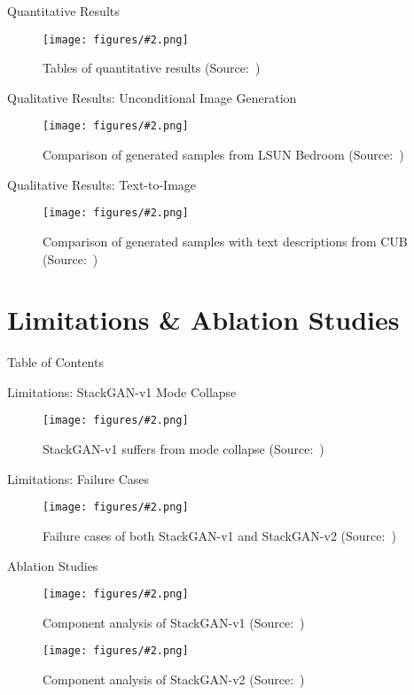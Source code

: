 \documentclass{beamer}
\newcommand{\paperfigure}[3][width=\textwidth]{%
    \begin{figure}%
        \centering%
        \texttt{[image: figures/\#2.png]}%
        \caption{#3 (Source:~\cite{stackgan++})}%
    \end{figure}%
}
\begin{document}

\begin{frame}{Quantitative Results}
    \paperfigure[width=\textwidth]{quantitative_results}{Tables of quantitative results}
\end{frame}

\begin{frame}{Qualitative Results: Unconditional Image Generation}
    \paperfigure[width=\textwidth]{qualitative_results_unconditional}{Comparison of generated samples from LSUN Bedroom}
\end{frame}

\begin{frame}{Qualitative Results: Text-to-Image}
    \paperfigure[width=0.9\textwidth]{qualitative_results_conditional}{Comparison of generated samples with text descriptions from CUB}
\end{frame}

\section{Limitations \& Ablation Studies}
\begin{frame}{Table of Contents}
    \tableofcontents[currentsection]
\end{frame}

\begin{frame}{Limitations: StackGAN-v1 Mode Collapse}
    \paperfigure[width=\textwidth]{mode_collapse}{StackGAN-v1 suffers from mode collapse}
\end{frame}

\begin{frame}{Limitations: Failure Cases}
    \paperfigure[width=\textwidth]{failure_cases}{Failure cases of both StackGAN-v1 and StackGAN-v2}
\end{frame}

\begin{frame}{Ablation Studies}
    \paperfigure[width=0.5\textwidth]{ablation_v1}{Component analysis of StackGAN-v1}
    \paperfigure[width=0.9\textwidth]{ablation_v2}{Component analysis of StackGAN-v2}
\end{frame}
\end{document}
